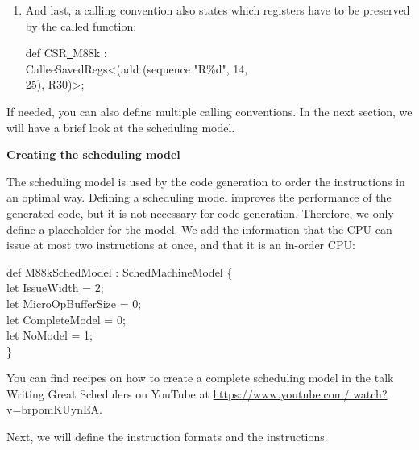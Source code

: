 \begin{enumerate}
\item And last, a calling convention also states which registers have to be preserved by the called function:
\begin{tcolorbox}[colback=white,colframe=black]
def CSR\underline{~}M88k : \\
\hspace*{1.5cm}CalleeSavedRegs<(add (sequence "R\%d", 14, \\
\hspace*{2cm}25), R30)>;
\end{tcolorbox}

\end{enumerate}

If needed, you can also define multiple calling conventions. In the next section, we will have a brief look at the scheduling model.\par


\hspace*{\fill} \par %
\textbf{Creating the scheduling model}

The scheduling model is used by the code generation to order the instructions in an optimal way. Defining a scheduling model improves the performance of the generated code, but it is not necessary for code generation. Therefore, we only define a placeholder for the model. We add the information that the CPU can issue at most two instructions at once, and that it is an in-order CPU:\par

\begin{tcolorbox}[colback=white,colframe=black]
def M88kSchedModel : SchedMachineModel \{ \\
\hspace*{1cm}let IssueWidth = 2; \\
\hspace*{1cm}let MicroOpBufferSize = 0; \\
\hspace*{1cm}let CompleteModel = 0; \\
\hspace*{1cm}let NoModel = 1; \\
\}
\end{tcolorbox}

You can find recipes on how to create a complete scheduling model in the talk Writing Great Schedulers on YouTube at \url{https://www.youtube.com/
watch?v=brpomKUynEA}.\par

Next, we will define the instruction formats and the instructions.\par

